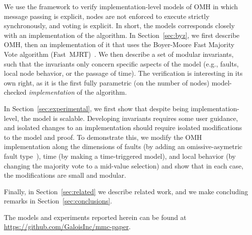 \documentclass{llncs/llncs}
\newcommand{\OMH}{\ensuremath{\mathrm{OMH}}\xspace}
\begin{document}

We use the framework to verify implementation-level models of \OMH in which message passing is explicit, nodes are not enforced to execute strictly synchronously, and voting is explicit. In short, the models corresponds closely with an implementation of the algorithm. In Section~\ref{sec:byz}, we first describe \OMH, then an implementation of it that uses the Boyer-Moore Fast Majority Vote algorithm (Fast~MJRT)~\cite{mjrty}. We then describe a set of modular invariants, such that the invariants only concern specific aspects of the model (e.g., faults, local node behavior, or the passage of time). The verification is interesting in its own right, as it is the first fully parametric (on the number of nodes) model-checked \emph{implementation} of the algorithm.

In Section~\ref{sec:experimental}, we first show that despite being implementation-level, the model is scalable. Developing invariants requires some user guidance, and isolated changes to an implementation should require isolated modifications to the model and proof. To demonstrate this, we modify the \OMH implementation along the dimensions of faults (by adding an omissive-asymetric fault type~\cite{omissive}), time (by making a time-triggered model), and local behavior (by changing the majority vote to a mid-value selection) and show that in each case, the modifications are small and modular.

Finally, in Section~\ref{sec:related} we describe related work, and we make concluding remarks in Section~\ref{sec:conclusions}.

The models and experiments reported herein can be found at \url{https://github.com/GaloisInc/mmc-paper}.

\end{document}

